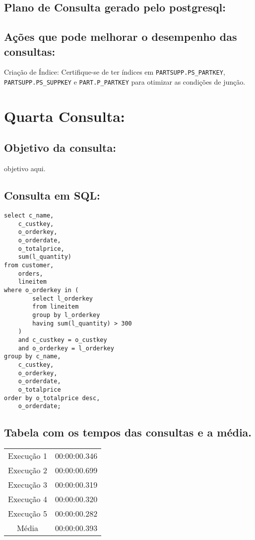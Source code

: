 \documentclass[12pt]{article}
\begin{document}
\begin{landscape}
\subsection{Plano de Consulta gerado pelo postgresql:}

\subsection{Ações que pode melhorar o desempenho das 
consultas:} Criação de Índice: Certifique-se de ter índices em \texttt{PARTSUPP.PS\_PARTKEY}, \texttt{PARTSUPP.PS\_SUPPKEY} e \texttt{PART.P\_PARTKEY} para otimizar as condições de junção.
\section{Quarta Consulta:}


\subsection{Objetivo da consulta:}
objetivo aqui.
\subsection{Consulta em SQL:}
\begin{lstlisting}
select c_name,
	c_custkey,
	o_orderkey,
	o_orderdate,
	o_totalprice,
	sum(l_quantity)
from customer,
	orders,
	lineitem
where o_orderkey in (
		select l_orderkey
		from lineitem
		group by l_orderkey
		having sum(l_quantity) > 300
	)
	and c_custkey = o_custkey
	and o_orderkey = l_orderkey
group by c_name,
	c_custkey,
	o_orderkey,
	o_orderdate,
	o_totalprice
order by o_totalprice desc,
	o_orderdate;
\end{lstlisting}

\subsection{Tabela com os tempos das consultas e a média.}
\begin{tabular}{|c|c|}
  \hline
  Execução 1 & 00:00:00.346 \\
  Execução 2 & 00:00:00.699 \\
  Execução 3 & 00:00:00.319 \\
  Execução 4 & 00:00:00.320 \\
  Execução 5 & 00:00:00.282 \\
  \hline
  Média & 00:00:00.393 \\
  \hline
\end{tabular}

\end{landscape}
\end{document}
